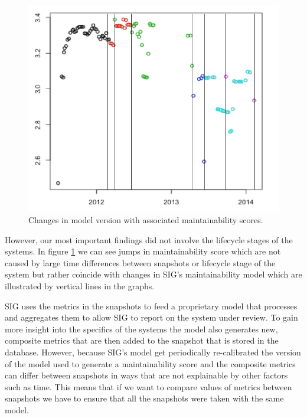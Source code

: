 \begin{figure}[htb]
\begin{minipage}{.45\linewidth}
\includegraphics[width=\linewidth]{figs/model3.png}
\end{minipage}
\caption{Changes in model version with associated maintainability scores.}
\label{fig:model_inf}
\end{figure}

However, our most important findings did not involve the lifecycle stages of the systems. In figure \ref{fig:model_inf} we can see jumps in maintainability score which are not caused by large time differences between snapshots or lifecycle stage of the system but rather coincide with changes in SIG's maintainability model which are illustrated by vertical lines in the graphs. 

SIG uses the metrics in the snapshots to feed a proprietary model that processes and aggregates them to allow SIG to report on the system under review. To gain more insight into the specifics of the systems the model also generates new, composite metrics that are then added to the snapshot that is stored in the database. However, because SIG's model get periodically re-calibrated the version of the model used to generate a maintainability score and the composite metrics can differ between snapshots in ways that are not explainable by other factors such as time. This means that if we want to compare values of metrics between snapshots we have to ensure that all the snapshots were taken with the same model.

